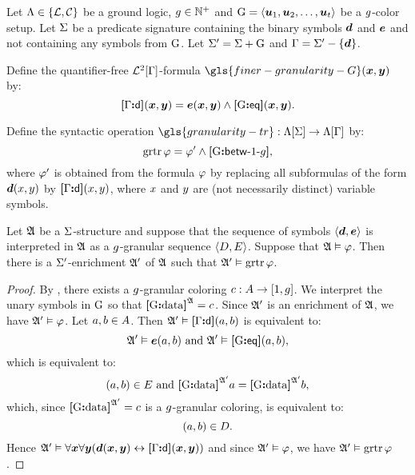 Let $\Lambda \in \left\{\mathcal{L}, \mathcal{C}\right\}$ be a ground logic,
$g \in \mathbb{N}^{+}$ and
${\mathrm{G}} = \left\langle \bm{u}_{1},\bm{u}_{2},\dots,\bm{u}_{t} \right\rangle$ be a $g$-color setup.
Let $\mathrm{\Sigma}$ be a predicate signature containing the binary symbols
$\bm{d}$ and $\bm{e}$ and not containing any symbols from ${\mathrm{G}}$.
Let $\mathrm{\Sigma'} = \mathrm{\Sigma} + {\mathrm{G}}$ and $\mathrm{\Gamma} = \mathrm{\Sigma'} - \left\{\bm{d}\right\}$.

\begin{definition}
Define the quantifier-free $\mathcal{L}^{2}[\mathrm{\Gamma}]$-formula
$\gls{finer-granularity-G}(\xx,\yy)$ by:
\[
  {\bm{[}\mathrm{\Gamma}\mathord{\bm{:}}\mathsf{d}\bm{]}}(\bm{x},\bm{y}) = \bm{e}(\bm{x},\bm{y}) \land {\bm{[}{\mathrm{G}}\mathord{\bm{:}}\mathsf{eq}\bm{]}}(\bm{x},\bm{y}).
\]
\end{definition}
\begin{definition}
Define the syntactic operation $\gls{granularity-tr} : \aLF\SigS \to
\aLF\SigG$ by:
\[
  \operatorname{grtr}\varphi = {\varphi'} \land {\bm{[}{\mathrm{G}}\mathord{\bm{:}}\mathsf{betw}{\hbox{-}}1{\hbox{-}}g\bm{]}},
\]
where ${\varphi'}$ is obtained from the formula $\varphi$ by replacing all subformulas
of the form $\bm{d}(x,y)$ by ${\bm{[}\mathrm{\Gamma}\mathord{\bm{:}}\mathsf{d}\bm{]}}(x,y)$, where $x$ and $y$ are (not
necessarily distinct) variable symbols.
\end{definition}

\begin{lemma}\label{lem:granular-f-to-tr}
Let $\mathfrak{A}$ be a $\mathrm{\Sigma}$-structure and suppose that the sequence of
symbols $\left\langle \bm{d},\bm{e} \right\rangle$ is interpreted in $\mathfrak{A}$ as a
$g$-granular sequence $\left\langle D,E \right\rangle$.
Suppose that $\mathfrak{A} \vDash \varphi$.
Then there is a $\mathrm{\Sigma'}$-enrichment $\mathfrak{A'}$ of $\mathfrak{A}$ such that
$\mathfrak{A'} \vDash \operatorname{grtr}\varphi$.
\end{lemma}
\begin{proof}
By , there exists a $g$-granular coloring 
$c : A \to [1,g]$.
We interpret the unary symbols in ${\mathrm{G}}$ so that ${\bm{[}{\mathrm{G}}\mathord{\bm{:}}\mathrm{data}\bm{]}}^{\mathfrak{A}} = c$.
Since $\mathfrak{A'}$ is an enrichment of $\mathfrak{A}$, we have $\mathfrak{A'} \vDash \varphi$.
Let $a, b \in A$.
Then $\mathfrak{A'} \vDash {\bm{[}\mathrm{\Gamma}\mathord{\bm{:}}\mathsf{d}\bm{]}}(a,b)$ is equivalent to:
\[
  \mathfrak{A'} \vDash \bm{e}(a,b) \text{ and } \mathfrak{A'} \vDash {\bm{[}{\mathrm{G}}\mathord{\bm{:}}\mathsf{eq}\bm{]}}(a,b),
\]
which is equivalent to:
\[
  (a,b) \in E \text{ and } {\bm{[}{\mathrm{G}}\mathord{\bm{:}}\mathrm{data}\bm{]}}^{\mathfrak{A'}}a = {\bm{[}{\mathrm{G}}\mathord{\bm{:}}\mathrm{data}\bm{]}}^{\mathfrak{A'}}b,
\]
which, since ${\bm{[}{\mathrm{G}}\mathord{\bm{:}}\mathrm{data}\bm{]}}^{\mathfrak{A'}} = c$ is a $g$-granular coloring, is
equivalent to:
\[
  (a,b) \in D.
\]
Hence $\mathfrak{A'} \vDash \forall\bm{x}\forall\bm{y}(\bm{d}(\bm{x},\bm{y}) \leftrightarrow {\bm{[}\mathrm{\Gamma}\mathord{\bm{:}}\mathsf{d}\bm{]}}(\bm{x},\bm{y}))$
and since $\mathfrak{A'} \vDash \varphi$, we have $\mathfrak{A'} \vDash \operatorname{grtr}\varphi$.
\end{proof}


